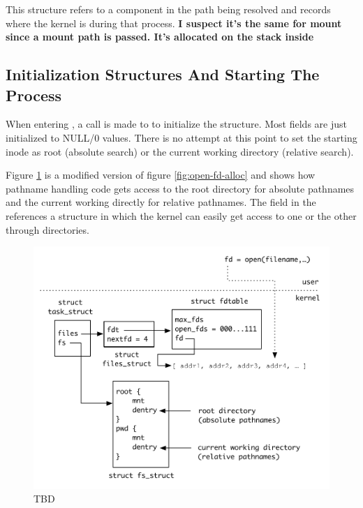 \noindent
This structure refers to a component in the path being resolved and records where the kernel is during that process. \textbf{I suspect it's the same for mount since a mount path is passed. It's allocated on the stack inside }


\subsection{Initialization Structures And Starting The Process}

When entering , a call is made to  to initialize the  structure. Most fields are just initialized to NULL/0 values. There is no attempt at this point to set the starting inode as root (absolute search) or the current working directory (relative search).

Figure \ref{fig:cwd-and-root-directory} is a modified version of figure \ref{fig:open-fd-alloc} and shows how pathname handling code gets access to the root directory for absolute pathnames and the current working directly for relative pathnames. The  field in the  references a  structure in which the kernel can easily get access to one or the other through directories. 

\begin{figure}[h]
	\includegraphics[scale=0.6]{figures/cwd-and-root-directory.pdf}
	\centering
	\caption{TBD}
	\label{fig:cwd-and-root-directory}
\end{figure}

